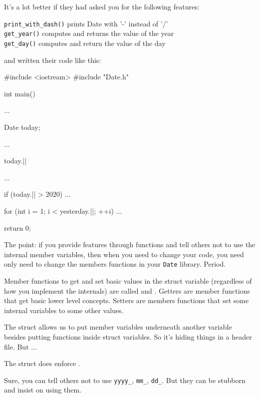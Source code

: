 It's a lot better if they had asked you for the
following features:
\begin{center}
\texttt{print\_with\_dash()} prints Date with '-' instead of '/'\\

\texttt{get\_year()} computes and returns the value of the year\\

\texttt{get\_day()} computes and return the value of the day\\
\end{center}

and written their code like this:

\begin{consolethree}[escapeinside=||]
#include <iostream>
#include "Date.h"

int main()
{
    ...

    Date today;

    ...

    today.||

    ...

    if (today.|| > 2020)
    {
        ...
    }

    for (int i = 1; i < yesterday.||; ++i)
    {
        ...
    }

    return 0;
}
\end{consolethree}
The point: if you provide features through functions and tell others not
to use the internal member variables, then when you need to change your
code, you need only need to change the members functions in your
\texttt{Date} library. Period.



Member functions to get and set basic values in the struct variable
(regardless of how you implement the internals) are called
 and . Getters are member functions that
get basic lower level concepts. Setters are members functions that set
some internal variables to some other values.

The struct allows us to put member variables underneath another variable
besides putting functions inside struct variables. So
it's hiding things in a header file. But ...

The struct does  enforce .

Sure, you can tell others not to use \texttt{yyyy\_}, \texttt{mm\_},
\texttt{dd\_}. But they can be stubborn and insist on using them.

